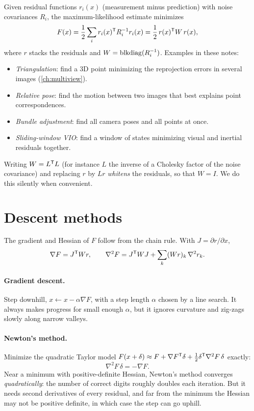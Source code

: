 Given residual functions $r_i(x)$ (measurement minus prediction) with noise covariances $R_i$, the maximum-likelihood estimate minimizes
\begin{equation}
  F(x) = \frac12\sum_i r_i(x)^{\mathsf{T}} R_i^{-1} r_i(x) = \frac12\,r(x)^{\mathsf{T}} W\,r(x),
  \label{eq:nlls}
\end{equation}
where $r$ stacks the residuals and $W = \operatorname{blkdiag}(R_i^{-1})$. Examples in these notes:
\begin{itemize}
  \item \emph{Triangulation}: find a 3D point minimizing the reprojection errors in several images (\cref{ch:multiview}).
  \item \emph{Relative pose}: find the motion between two images that best explains point correspondences.
  \item \emph{Bundle adjustment}: find all camera poses and all points at once.
  \item \emph{Sliding-window VIO}: find a window of states minimizing visual and inertial residuals together.
\end{itemize}
Writing $W = L^{\mathsf{T}} L$ (for instance $L$ the inverse of a Cholesky factor of the noise covariance) and replacing $r$ by $Lr$ \emph{whitens} the residuals,
so that $W = I$. We do this silently when convenient.

\section{Descent methods}

The gradient and Hessian of $F$ follow from the chain rule. With $J = \partial r/\partial x$,
\begin{equation}
  \nabla F = J^{\mathsf{T}} Wr, \qquad \nabla^2F = J^{\mathsf{T}} WJ + \sum_k(Wr)_k\,\nabla^2r_k .
  \label{eq:nlls-derivatives}
\end{equation}

\paragraph{Gradient descent.} Step downhill, $x \gets x - \alpha\nabla F$, with a step length $\alpha$ chosen by a line search. It always makes progress for small
enough $\alpha$, but it ignores curvature and zig-zags slowly along narrow valleys.

\paragraph{Newton's method.} Minimize the quadratic Taylor model $F(x + \delta) \approx F + \nabla F^{\mathsf{T}}\delta + \tfrac12\delta^{\mathsf{T}}\nabla^2F\,\delta$ exactly:
\begin{equation}
  \nabla^2F\,\delta = -\nabla F .
\end{equation}
Near a minimum with positive-definite Hessian, Newton's method converges \emph{quadratically}: the number of correct digits roughly doubles each
iteration. But it needs second derivatives of every residual, and far from the minimum the Hessian may not be positive definite, in which case the
step can go uphill.

